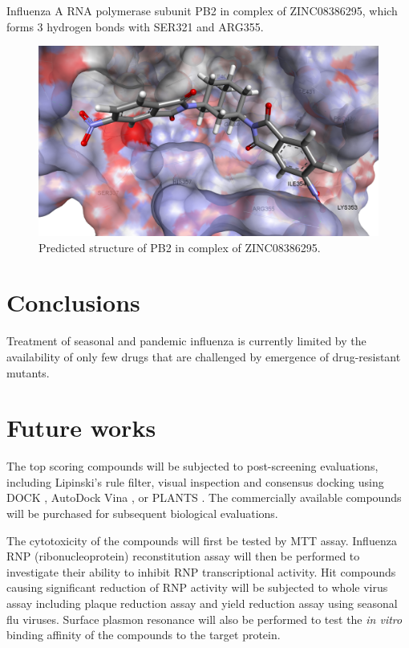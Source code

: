 Influenza A RNA polymerase subunit PB2 in complex of ZINC08386295, which forms 3 hydrogen bonds with SER321 and ARG355.

\begin{figure}
\centering
\includegraphics[width=\linewidth]{../influenza/2VQZ-ZINC08386295.png}
\caption{Predicted structure of PB2 in complex of ZINC08386295.}
\label{influenza:2VQZ-ZINC08386295}
\end{figure}

\section{Conclusions}

Treatment of seasonal and pandemic influenza is currently limited by the availability of only few drugs that are challenged by emergence of drug-resistant mutants.

\section{Future works}

The top scoring compounds will be subjected to post-screening evaluations, including Lipinski's rule filter, visual inspection and consensus docking using DOCK \citep{1222}, AutoDock Vina \citep{595}, or PLANTS \citep{610,607,779}. The commercially available compounds will be purchased for subsequent biological evaluations.

The cytotoxicity of the compounds will first be tested by MTT assay. Influenza RNP (ribonucleoprotein) reconstitution assay will then be performed to investigate their ability to inhibit RNP transcriptional activity. Hit compounds causing significant reduction of RNP activity will be subjected to whole virus assay including plaque reduction assay and yield reduction assay using seasonal flu viruses. Surface plasmon resonance will also be performed to test the \textit{in vitro} binding affinity of the compounds to the target protein. 

